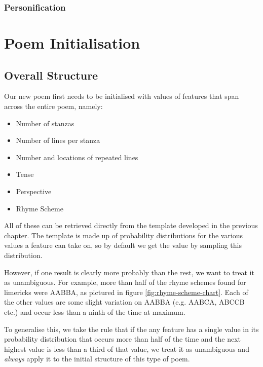 \subsubsection{Personification}


\section{Poem Initialisation}

\subsection{Overall Structure}
Our new poem first needs to be initialised with values of features that span across the entire poem, namely:
\begin{itemize}
\item{Number of stanzas}
\item{Number of lines per stanza}
\item{Number and locations of repeated lines}
\item{Tense}
\item{Perspective}
\item{Rhyme Scheme}
\end{itemize}

All of these can be retrieved directly from the template developed in the previous chapter. The template is made up of probability distributions for the various values a feature can take on, so by default we get the value by sampling this distribution. 

However, if one result is clearly more probably than the rest, we want to treat it as unambiguous. For example, more than half of the rhyme schemes found for limericks were AABBA, as pictured in figure \ref{fig:rhyme-scheme-chart}. Each of the other values are some slight variation on AABBA (e.g. AABCA, ABCCB etc.) and occur less than a ninth of the time at maximum.

To generalise this, we take the rule that if the any feature has a single value in its probability distribution that occurs more than half of the time and the next highest value is less than a third of that value, we treat it as unambiguous and \textit{always} apply it to the initial structure of this type of poem.


